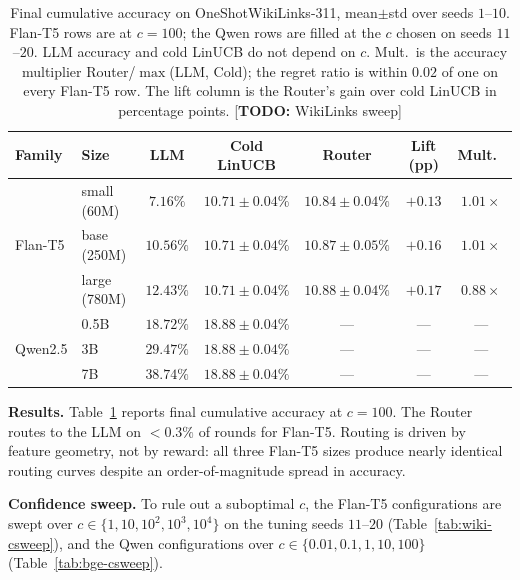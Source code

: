 \documentclass{article}
\theoremstyle{definition}
\theoremstyle{remark}
\theoremstyle{remark}
\newcommand{\todo}[1]{\textcolor{red!70!black}{[\textbf{TODO:} #1]}}
\begin{document}
\begin{table}[h]
\centering
\caption{Final cumulative accuracy on OneShotWikiLinks-311, mean$\pm$std over
seeds $1$--$10$. Flan-T5 rows are at $c=100$; the Qwen rows are filled at the
$c$ chosen on seeds $11$--$20$. LLM accuracy and cold LinUCB do not depend on
$c$. Mult.\ is the accuracy multiplier Router/$\max$(LLM, Cold); the regret
ratio is within $0.02$ of one on every Flan-T5 row. The lift column is the
Router's gain over cold LinUCB in percentage points. \todo{WikiLinks sweep}}
\label{tab:wiki-results}
\small
\begin{tabular}{@{}llccccc@{}}
\toprule
Family & Size & LLM & Cold LinUCB & Router & Lift (pp) & Mult.\ \\
\midrule
\multirow{3}{*}{Flan-T5} & small (60M) & $7.16\%$  & $10.71\pm 0.04\%$ & $10.84\pm 0.04\%$ & $+0.13$ & $1.01\times$ \\
& base (250M)   & $10.56\%$ & $10.71\pm 0.04\%$ & $10.87\pm 0.05\%$ & $+0.16$ & $1.01\times$ \\
& large (780M)  & $12.43\%$ & $10.71\pm 0.04\%$ & $10.88\pm 0.04\%$ & $+0.17$ & $0.88\times$ \\
\midrule
\multirow{3}{*}{Qwen2.5} & 0.5B  & $18.72\%$ & $18.88\pm 0.04\%$ & --- & --- & --- \\
& 3B  & $29.47\%$ & $18.88\pm 0.04\%$ & --- & --- & --- \\
& 7B  & $38.74\%$ & $18.88\pm 0.04\%$ & --- & --- & --- \\
\bottomrule
\end{tabular}
\end{table}

\textbf{Results.} Table~\ref{tab:wiki-results} reports final cumulative
accuracy at $c=100$. The Router routes to the LLM on $<0.3\%$ of rounds for
Flan-T5. Routing is driven by feature geometry, not by
reward: all three Flan-T5 sizes produce nearly identical routing curves
despite an order-of-magnitude spread in accuracy.

\textbf{Confidence sweep.} To rule out a suboptimal $c$, the Flan-T5
configurations are swept over $c\in\{1,10,10^2,10^3,10^4\}$ on the tuning seeds
$11$--$20$ (Table~\ref{tab:wiki-csweep}), and the Qwen configurations over
$c\in\{0.01,0.1,1,10,100\}$ (Table~\ref{tab:bge-csweep}).
\end{document}
